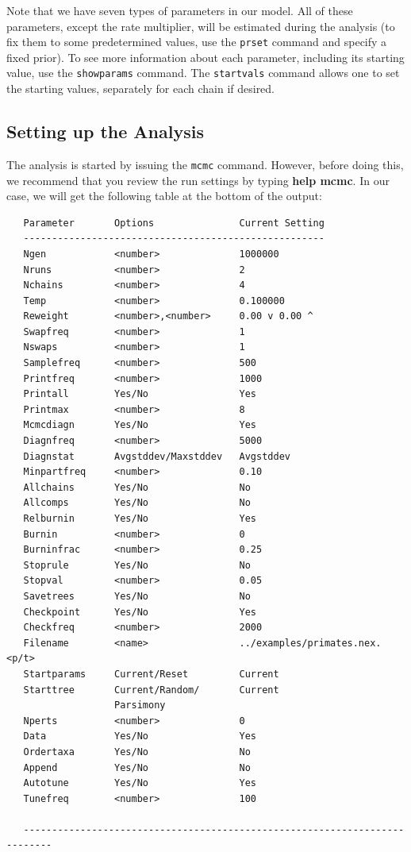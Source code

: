 \documentclass[12pt]{book}
\begin{document}
Note that we have seven types of parameters in our model. All of these parameters, except the rate multiplier,
 will be estimated during the analysis (to fix them to some predetermined values, use the \texttt{prset}
 command and specify a fixed prior). To see more information about each parameter, including its starting
 value, use the \texttt{showparams} command. The \texttt{startvals} command allows one to set the starting
 values, separately for each chain if desired.

\subsection{Setting up the Analysis}

The analysis is started by issuing the \texttt{mcmc} command. However, before doing this, we recommend that
 you review the run settings by typing \textbf{help mcmc}. In our case, we will get the following table at
 the bottom of the output:

\begin{singlespacing}
\footnotesize
\begin{verbatim}
   Parameter       Options               Current Setting
   -----------------------------------------------------
   Ngen            <number>              1000000
   Nruns           <number>              2
   Nchains         <number>              4
   Temp            <number>              0.100000
   Reweight        <number>,<number>     0.00 v 0.00 ^
   Swapfreq        <number>              1
   Nswaps          <number>              1
   Samplefreq      <number>              500
   Printfreq       <number>              1000
   Printall        Yes/No                Yes
   Printmax        <number>              8
   Mcmcdiagn       Yes/No                Yes
   Diagnfreq       <number>              5000
   Diagnstat       Avgstddev/Maxstddev   Avgstddev
   Minpartfreq     <number>              0.10
   Allchains       Yes/No                No
   Allcomps        Yes/No                No
   Relburnin       Yes/No                Yes
   Burnin          <number>              0
   Burninfrac      <number>              0.25
   Stoprule        Yes/No                No
   Stopval         <number>              0.05
   Savetrees       Yes/No                No
   Checkpoint      Yes/No                Yes
   Checkfreq       <number>              2000
   Filename        <name>                ../examples/primates.nex.<p/t>
   Startparams     Current/Reset         Current
   Starttree       Current/Random/       Current
                   Parsimony
   Nperts          <number>              0
   Data            Yes/No                Yes
   Ordertaxa       Yes/No                No
   Append          Yes/No                No
   Autotune        Yes/No                Yes
   Tunefreq        <number>              100

   ---------------------------------------------------------------------------
\end{verbatim}
\normalsize
\end{singlespacing}
\end{document}
